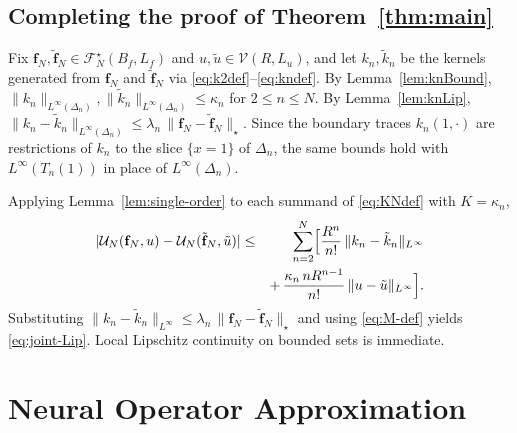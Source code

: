 \documentclass[10pt,a4paper]{amsart}
\newcommand{\Linf}{L^\infty}
\begin{document}
\subsection{Completing the proof of Theorem~\ref{thm:main}}
\label{sec:proof}

Fix $\mathbf{f}_N,\tilde{\mathbf{f}}_N\in\mathcal{F}_N^\star(B_f,L_f)$ and $u,\tilde u\in\mathcal{V}(R,L_u)$, and let $k_n,\tilde k_n$ be the kernels generated from $\mathbf{f}_N$ and $\tilde{\mathbf{f}}_N$ via \eqref{eq:k2def}--\eqref{eq:kndef}. By Lemma~\ref{lem:knBound}, $\|k_n\|_{\Linf(\Delta_n)},\|\tilde k_n\|_{\Linf(\Delta_n)}\le\kappa_n$ for $2\le n\le N$. By Lemma~\ref{lem:knLip}, $\|k_n-\tilde k_n\|_{\Linf(\Delta_n)}\le\lambda_n\,\|\mathbf{f}_N-\tilde{\mathbf{f}}_N\|_\star$. Since the boundary traces $k_n(1,\cdot)$ are restrictions of $k_n$ to the slice $\{x = 1\}$ of $\Delta_n$, the same bounds hold with $\Linf(T_n(1))$ in place of $\Linf(\Delta_n)$.

Applying Lemma~\ref{lem:single-order} to each summand of \eqref{eq:KNdef} with $K=\kappa_n$,
\begin{eqnarray}
|\mathcal{U}_N(\mathbf{f}_N,u) - \mathcal{U}_N(\tilde{\mathbf{f}}_N,\tilde u)| &\le& \sum_{n=2}^N\Bigl[\frac{R^n}{n!}\,\|k_n-\tilde k_n\|_{\Linf} \nonumber \\
&& +\, \frac{\kappa_n\,n R^{n-1}}{n!}\,\|u-\tilde u\|_{\Linf}\Bigr].
\label{eq:UN-diff-bnd}
\end{eqnarray}
Substituting $\|k_n-\tilde k_n\|_{\Linf}\le\lambda_n\,\|\mathbf{f}_N-\tilde{\mathbf{f}}_N\|_\star$ and using \eqref{eq:M-def} yields \eqref{eq:joint-Lip}. Local Lipschitz continuity on bounded sets is immediate.


\section{Neural Operator Approximation}
\label{sec:NO}
\end{document}
